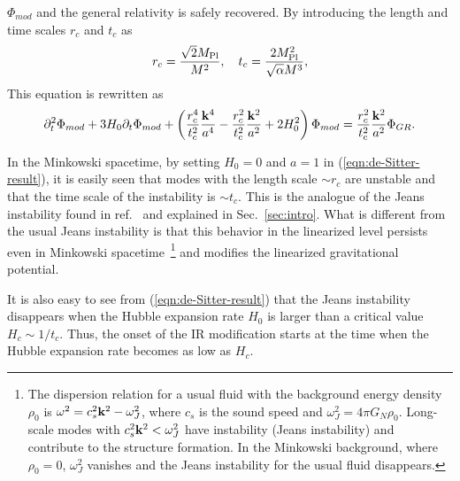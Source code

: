 $\Phi_{mod}$ and the general relativity is safely recovered. By
introducing the length and time scales $r_c$ and $t_c$ as  
%
\begin{equation}
 r_c = \frac{\sqrt{2}M_{\rm Pl}}{M^2}, \quad
  t_c = \frac{2M_{\rm Pl}^2}{\sqrt{\alpha} M^3}, 
\end{equation}
This equation is rewritten as
%
\begin{equation}
 \partial_t^2\Phi_{mod} +3H_0\partial_t\Phi_{mod}
  + \left(\frac{r_c^4}{t_c^2}\frac{{\bf k}^4}{a^4}
     - \frac{r_c^2}{t_c^2}\frac{{\bf k}^2}{a^2}
     + 2H_0^2\right)\Phi_{mod}
  = \frac{r_c^2}{t_c^2}\frac{{\bf k}^2}{a^2}\Phi_{GR}.
  \label{eqn:de-Sitter-result}
\end{equation}


In the Minkowski spacetime, by setting $H_0=0$ and $a=1$ in
(\ref{eqn:de-Sitter-result}), it is easily seen that modes with the
length scale $\sim r_c$ are unstable and that the time scale of the 
instability is $\sim t_c$. This is the analogue of the Jeans instability
found in ref.~\cite{Arkani-Hamed:2003uy} and explained in
Sec.~\ref{sec:intro}. What is different from the usual Jeans instability
is that this behavior in the linearized level persists even in Minkowski
spacetime~\footnote{
The dispersion relation for a usual fluid with the background energy
density $\rho_0$ is $\omega^2=c_s^2{\bf k}^2-\omega_J^2$, where $c_s$ is
the sound speed and $\omega_J^2=4\pi G_N\rho_0$. Long-scale modes with
$c_s^2{\bf k}^2<\omega_J^2$ have instability (Jeans instability) and
contribute to the structure formation. In the Minkowski background,
where $\rho_0=0$, $\omega_J^2$ vanishes and the Jeans instability for
the usual fluid disappears.} 
and modifies the linearized gravitational potential. 


It is also easy to see from (\ref{eqn:de-Sitter-result}) that the Jeans
instability disappears when the Hubble expansion rate $H_0$ is larger
than a critical value $H_c\sim 1/t_c$. Thus, the onset of the IR
modification starts at the time when the Hubble expansion rate becomes
as low as $H_c$. 





